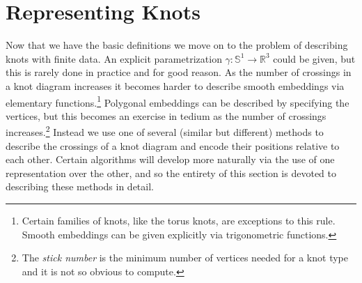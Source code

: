 \section{Representing Knots}
    Now that we have the basic definitions we move on to the problem of
    describing knots with finite data. An explicit parametrization
    $\gamma:\mathbb{S}^{1}\rightarrow\mathbb{R}^{3}$ could be given, but this
    is rarely done in practice and for good reason. As the number of crossings
    in a knot diagram increases it becomes harder to describe smooth embeddings
    via elementary functions.\footnote{%
        Certain families of knots, like the torus knots, are
        exceptions to this rule. Smooth embeddings can be given explicitly via
        trigonometric functions.
    }
    Polygonal embeddings can be described by specifying the vertices, but this
    becomes an exercise in tedium as the number of crossings
    increases.\footnote{%
        The \textit{stick number} is the minimum number of vertices needed
        for a knot type and it is not so obvious to compute.
    }
    Instead we use one of several (similar but different) methods to describe
    the crossings of a knot diagram and encode their positions relative to
    each other. Certain algorithms will develop more naturally via the use
    of one representation over the other, and so the entirety of this section
    is devoted to describing these methods in detail.

